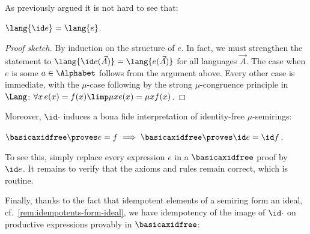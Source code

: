 \documentclass[runningheads]{amsart}
\begin{document}
As previously argued it is not hard to see that:
\begin{proposition}
\label{idem-trans-equiv-in-lang}
    $\lang {\id e} = \lang {e}$.
\end{proposition}
\begin{proof}
[Proof sketch]
    By induction on the structure of $e$. In fact, we must strengthen the statement to $\lang {\id e(\vec A)} = \lang {e(\vec A)}$ for all languages $\vec A$.
    The case when $e$ is some $a \in \Alphabet$ follows from the argument above.
    Every other case is immediate, with the $\mu$-case following by the strong $\mu$-congruence principle in $\Lang$: $\forall x\,    e(x) =f(x) \limp \mu x e(x) = \mu x f(x)$.
\end{proof}

Moreover, $\id \cdot$ induces a bona fide interpretation of identity-free $\mu$-semirings:

\begin{proposition}
\label{idem-trans-is-an-interp}
    $\basicaxidfree\proves e=f \implies \basicaxidfree \proves \id e = \id f$.
\end{proposition}
\noindent
To see this, simply replace every expression $e $ in a $\basicaxidfree$ proof by $\id e$. It remains to verify that the axioms and rules remain correct, which is routine.




Finally, thanks to the fact that idempotent elements of a semiring form an ideal, cf.~\cref{rem:idempotents-form-ideal}, we have idempotency of the image of $\id \cdot $ on productive expressions provably in $\basicaxidfree$:
\end{document}
